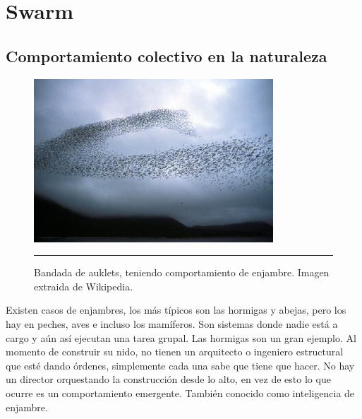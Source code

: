 
\chapter{Swarm} %

\label{Chapter2} %



\section{Comportamiento colectivo en la naturaleza}

\begin{figure}[htbp]
	\centering
		\includegraphics[width=0.8\textwidth]{./Figures/swarm.jpg}
		\rule{35em}{0.5pt}
	\caption[swarm]{Bandada de auklets, teniendo comportamiento de enjambre. Imagen extraida de Wikipedia.}
	\label{fig:swarm}
\end{figure}

Existen casos de enjambres, los más típicos son las hormigas y abejas, pero los hay en peches, aves e incluso los mamíferos. Son sistemas donde nadie está a cargo y aún así ejecutan una tarea grupal. Las hormigas son un gran ejemplo. Al momento de construir su nido, no tienen un arquitecto o ingeniero estructural que esté dando órdenes, simplemente cada una sabe que tiene que hacer. No hay un director orquestando la construcción desde lo alto, en vez de esto lo que ocurre es un comportamiento emergente. También conocido como inteligencia de enjambre.

